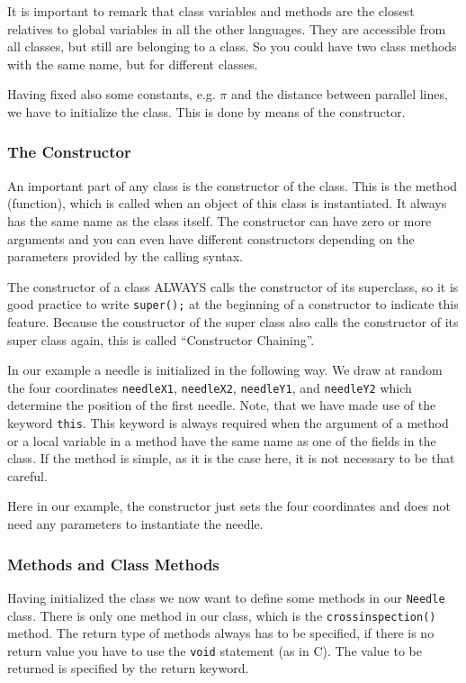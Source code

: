 It is important to remark that
class variables and methods are the closest relatives to global 
variables in all the other languages. They are accessible from all
classes, but still are belonging to a class. So you could have two
class methods with the same name, but for different classes.

Having fixed also some constants, e.g. $\pi$ and the distance between
parallel lines, we have to initialize the class. This is done by means
of the constructor.

\subsubsection{The Constructor}
An important part of any class is the constructor of the class. This is
the method (function), which is called when an object of this
class is instantiated. It always has the same name as the class itself.
The constructor can have zero or more arguments and you can even
have different constructors depending on the parameters provided by
the calling syntax.

The constructor of a class ALWAYS calls the constructor of its
superclass, so it is good practice to write \verb|super();| at the
beginning of a constructor to indicate this feature. Because the 
constructor of the super class also calls the constructor of its super
class again, this is called ``Constructor Chaining''.

In our example a needle is initialized in the following way. We draw
at random the four coordinates \verb|needleX1|, \verb|needleX2|,
\verb|needleY1|, and \verb|needleY2| which determine the position of
the first needle. Note, that we have made use of the keyword
\verb|this|.
This keyword is always required when the argument of a method
or a local variable in a method have the same name as one of the fields
in the class. If the method is simple, as it is the case here, it is
not necessary to be that careful.

Here in our example, the constructor just sets the four coordinates
and does not need any parameters to instantiate the needle.

\subsubsection{Methods and Class Methods}
Having initialized the class we now want to define some methods in our
\verb|Needle| class. There is only one method in our class, which
is the \verb|crossinspection()| method.
The return type of methods always has to be specified, if
there is no return value you have to use the \verb|void| statement
(as in C). The value to be returned is specified by the return keyword.


